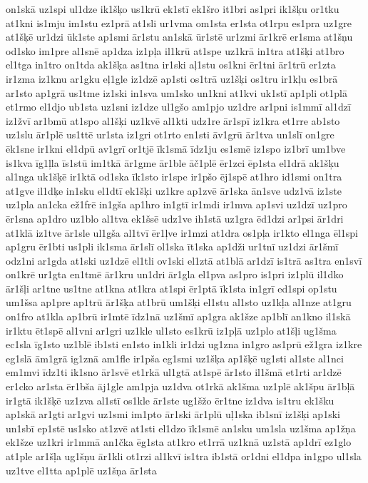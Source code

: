 {on1skā
uz1spi
ul1dze
ik1šķo
us1krū
ek1stī
ek1šro
it1bri
as1pri
ik1šķu
or1tku
at1kni
is1mju
im1stu
ez1prā
at1sli
ur1vma
om1sta
er1sta
ot1rpu
es1pra
uz1gre
at1šķē
ur1dzi
ūk1ste
ap1smi
ār1stu
an1skā
ūr1stē
ur1zmi
ār1krē
er1sma
at1šņu
od1sko
im1pre
al1snē
ap1dza
iz1pļa
il1krū
at1spe
uz1krā
in1tra
at1šķi
at1bro
el1tga
in1tro
on1tda
ak1šķa
as1tna
ir1ski
aļ1stu
os1kni
ēr1tni
ār1trū
er1zta
ir1zma
iz1knu
ar1gku
eļ1gle
iz1dzē
ap1sti
os1trā
uz1šķi
os1tru
ir1kļu
es1brā
ar1sto
ap1grā
us1tme
iz1ski
in1sva
um1sko
un1kni
at1kvi
uk1stī
ap1pli
ot1plā
et1rmo
el1djo
ub1sta
uz1sni
iz1dze
ul1gšo
am1pjo
uz1dre
ar1pni
is1mmī
al1dzī
iz1žvī
ar1bmū
at1spo
al1šķi
uz1kvē
al1kti
udz1re
ār1spī
iz1kra
et1rre
ab1sto
uz1slu
ār1plē
us1ttē
ur1sta
iz1gri
ot1rto
en1sti
āv1grū
ār1tva
un1slī
on1gre
ēk1sne
ir1kni
el1dpū
av1grī
or1tjē
īk1smā
īdz1ju
es1smē
iz1spo
iz1brī
um1bve
is1kva
īg1ļla
īs1stū
im1tkā
ār1gme
ār1ble
āč1plē
ēr1zci
ēp1sta
el1drā
ak1šķu
al1nga
uk1šķē
ir1ktā
od1ska
īk1sto
ir1spe
ir1pšo
ēj1spē
at1hro
id1smi
on1tra
at1gve
il1dķe
in1sku
el1dtī
ek1šķi
uz1kre
ap1zvē
ār1ska
ān1sve
udz1vā
iz1ste
uz1pla
an1cka
ež1frē
in1gša
ap1hro
in1gtī
ir1mdi
ir1mva
ap1svi
uz1dzī
uz1pro
ēr1sna
ap1dro
uz1blo
al1tva
ek1šsē
udz1ve
ih1stā
uz1gra
ēd1dzi
ar1psi
ār1dri
at1klā
iz1tve
ār1sle
ul1gša
al1tvī
ēr1ļve
ir1mzi
at1dra
os1pļa
ir1kto
el1nga
ēl1spi
ap1gru
ēr1bti
us1pli
ik1sma
ār1slī
ol1ska
īt1ska
ap1dži
ur1tnī
uz1dzi
ār1šmī
odz1ni
ar1gda
at1ski
uz1dzē
el1tli
ov1ski
el1ztā
at1blā
ar1dzī
is1trā
as1tra
en1svī
on1krē
ur1gta
en1tmē
ār1kru
un1dri
ār1gla
el1pva
as1pro
is1pri
iz1plū
il1dko
ār1šļi
ar1tne
us1tne
at1kna
at1kra
at1spi
ēr1ptā
īk1sta
in1grī
ed1spi
op1stu
um1šsa
ap1pre
ap1trū
ār1šķa
at1brū
um1šķi
el1stu
al1sto
uz1kļa
al1nze
at1gru
on1fro
at1kla
ap1brū
ir1mtē
īdz1nā
uz1šmī
ap1gra
ak1šze
ap1blī
an1kno
il1skā
ir1ktu
ēt1spē
al1vni
ar1gri
uz1kle
ul1sto
es1krū
iz1pļā
uz1plo
at1šļi
ug1šma
ec1sla
īg1sto
uz1blē
ib1sti
en1sto
in1kli
ir1dzi
ug1zna
in1gro
as1prū
ež1gra
iz1kre
eg1slā
ām1grā
ig1znā
am1fle
ir1pša
eg1smi
uz1šķa
ap1šķē
ug1sti
al1ste
al1nci
em1mvi
īdz1ti
ik1sno
ār1svē
et1rkā
ul1gtā
at1spē
ār1sto
il1šmā
et1rti
ar1dzē
er1cko
ar1sta
ēr1bša
āj1gle
am1pja
uz1dva
ot1rkā
ak1šma
uz1plē
ak1špu
ār1bļā
ir1gtā
ik1šķē
uz1zva
al1stī
os1kle
ār1ste
ug1šžo
ēr1tne
iz1dva
is1tru
ek1šku
ap1skā
ar1gti
ar1gvi
uz1smi
im1pto
ār1ski
ār1plū
uļ1ska
ib1snī
iz1šķi
ap1ski
un1sbī
ep1stē
us1sko
at1zvē
at1sti
el1dzo
īk1smē
an1sku
um1sla
uz1šma
ap1žņa
ek1šze
uz1kri
ir1mmā
an1čka
ēg1sta
at1kro
et1rrā
uz1knā
uz1stā
ap1drī
ez1glo
at1ple
ar1šļa
ug1šņu
ār1kli
ot1rzi
al1kvī
is1tra
ib1stā
or1dni
el1dpa
in1gpo
ul1sla
uz1tve
el1tta
ap1plē
uz1šņa
ār1sta
}
